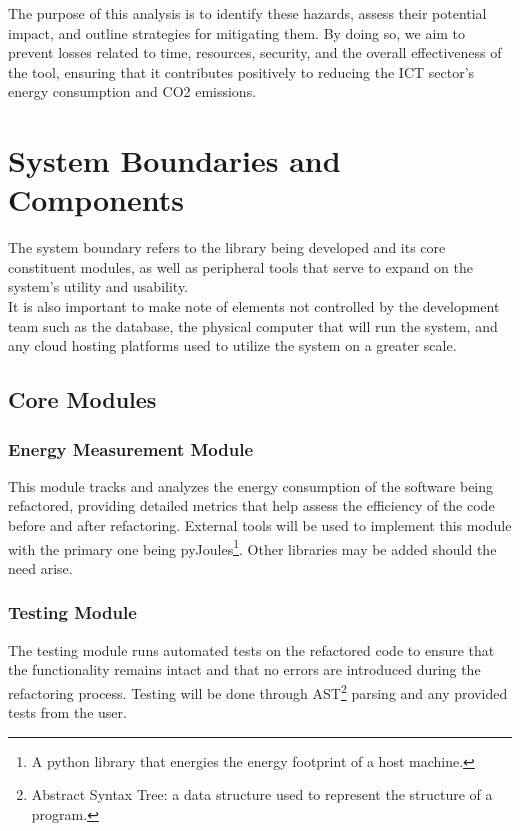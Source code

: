\documentclass{article}
\newcounter{hazard}
\begin{document}
The purpose of this analysis is to identify these hazards, assess their potential 
impact, and outline strategies for mitigating them. By doing so, we aim to prevent 
losses related to time, resources, security, and the overall effectiveness of the 
tool, ensuring that it contributes positively to reducing the ICT sector's energy 
consumption and CO2 emissions.

\section{System Boundaries and Components}

The system boundary refers to the library being developed and its core constituent modules, as well as peripheral tools that serve to expand on the system's utility and usability. \\

It is also important to make note of elements not controlled by the development team such as the database, the physical computer that will run the system, and any cloud hosting platforms used to utilize the system on a greater scale.

\subsection{Core Modules}

\subsubsection*{Energy Measurement Module}
This module tracks and analyzes the energy consumption of the software being refactored, providing detailed metrics that help assess the efficiency of the code before and after refactoring. External tools will be used to implement this module with the primary one being pyJoules\footnote{A python library that energies the energy footprint of a host machine.}. Other libraries may be added should the need arise. 

\subsubsection*{Testing Module}
The testing module runs automated tests on the refactored code to ensure that the functionality remains intact and that no errors are introduced during the refactoring process. Testing will be done through AST\footnote{Abstract Syntax Tree: a data structure used to represent the structure of a program.} parsing and any provided tests from the user.
\end{document}
